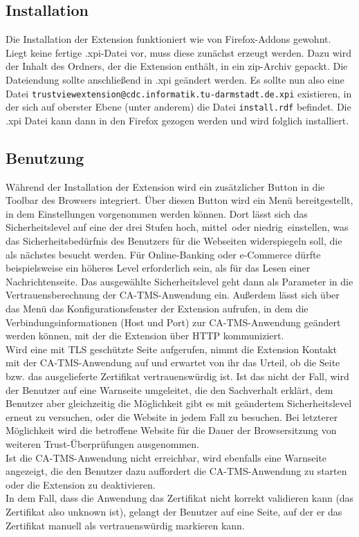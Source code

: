 \documentclass[accentcolor=tud1c,article,colorback,11pt]{tudreport}
\begin{document}
\subsection{Installation}
Die Installation der Extension funktioniert wie von Firefox-Addons gewohnt. Liegt keine fertige .xpi-Datei vor, muss diese zunächst erzeugt werden. Dazu wird der Inhalt des Ordners, der die Extension enthält, in ein zip-Archiv gepackt. Die Dateiendung sollte anschließend in .xpi geändert werden. Es sollte nun also eine Datei \texttt{trustviewextension@cdc.informatik.tu-darmstadt.de.xpi} existieren, in der sich auf oberster Ebene (unter anderem) die Datei \texttt{install.rdf} befindet. Die .xpi Datei kann dann in den Firefox gezogen werden und wird folglich installiert.

\subsection{Benutzung}
Während der Installation der Extension wird ein zusätzlicher Button in die Toolbar des Browsers integriert. Über diesen Button wird ein Menü bereitgestellt, in dem Einstellungen vorgenommen werden können. Dort lässt sich das Sicherheitslevel auf eine der drei Stufen \glqq hoch\grqq, \glqq mittel\grqq ~oder \glqq niedrig\grqq ~einstellen, was das Sicherheitsbedürfnis des Benutzers für die Webseiten widerspiegeln soll, die als nächstes besucht werden. Für Online-Banking oder e-Commerce dürfte beispielsweise ein höheres Level erforderlich sein, als für das Lesen einer Nachrichtenseite. Das ausgewählte Sicherheitslevel geht dann als Parameter in die Vertrauensberechnung der CA-TMS-Anwendung ein. Außerdem lässt sich über das Menü das Konfigurationsfenster der Extension aufrufen, in dem die Verbindungsinformationen (Host und Port) zur CA-TMS-Anwendung geändert werden können, mit der die Extension über HTTP kommuniziert.\\
Wird eine mit TLS geschützte Seite aufgerufen, nimmt die Extension Kontakt mit der CA-TMS-Anwendung auf und erwartet von ihr das Urteil, ob die Seite bzw. das ausgelieferte Zertifikat vertrauenswürdig ist. Ist das nicht der Fall, wird der Benutzer auf eine Warnseite umgeleitet, die den Sachverhalt erklärt, dem Benutzer aber gleichzeitig die Möglichkeit gibt es mit geändertem Sicherheitslevel erneut zu versuchen, oder die Website in jedem Fall zu besuchen. Bei letzterer Möglichkeit wird die betroffene Website für die Dauer der Browsersitzung von weiteren Trust-Überprüfungen ausgenommen.\\
Ist die CA-TMS-Anwendung nicht erreichbar, wird ebenfalls eine Warnseite angezeigt, die den Benutzer dazu auffordert die CA-TMS-Anwendung zu starten oder die Extension zu deaktivieren.\\
In dem Fall, dass die Anwendung das Zertifikat nicht korrekt validieren kann (das Zertifikat also unknown ist), gelangt der Benutzer auf eine Seite, auf der er das Zertifikat manuell als vertrauenswürdig markieren kann.
\end{document}
